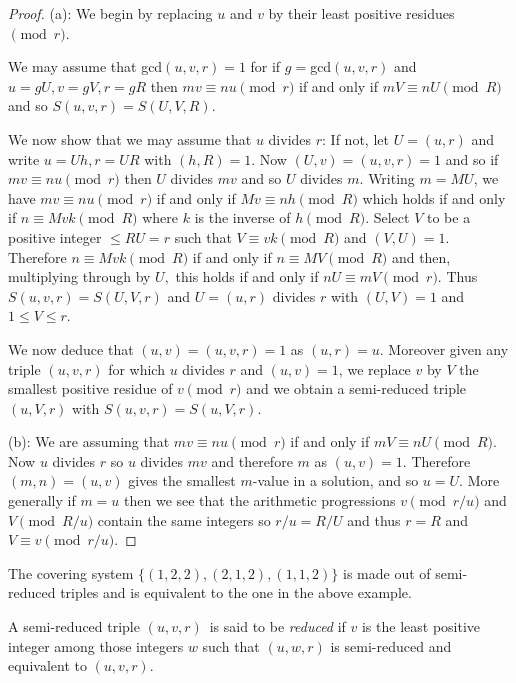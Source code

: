 \documentclass[12pt, a4paper,  reqno, english]{amsart}%
\numberwithin{equation}{section}
\theoremstyle{definition}
\renewcommand{\leq}{\leqslant}
\begin{document}
 \begin{proof}  (a):  We begin by replacing $u$ and $v$ by their least positive residues $\pmod r$.

 We may assume that gcd$(u,v,r)=1$ for if $g=$gcd$(u,v,r)$ and $u=gU, v=gV, r=gR$ then $mv\equiv nu \pmod r$ if and only if $mV\equiv nU \pmod R$ and so $S(u,v,r)=S(U,V,R)$.
 
 
 We now show that we may assume that $u$ divides $r$: If not, let
  $U=(u,r)$ and write $u=Uh, r=UR$ with $(h,R)=1$. Now $(U,v)=(u,v,r)=1$ and so if $mv\equiv nu \pmod r$ then $U$ divides $mv$ and so $U$ divides $m$. Writing $m=MU$, we have $mv\equiv nu \pmod r$ if and only if 
 $Mv\equiv n h \pmod { R}$  which holds  if and only if  $n \equiv M vk \pmod { R}$ where
$k$ is the inverse of $h \pmod R$. %
Select $V$ to be a positive integer $\leq   RU=r$ such that $V\equiv vk \pmod R$ and $(V,U)=1$. Therefore $n \equiv M vk \pmod { R}$ if and only if $n \equiv MV \pmod { R}$ and then, multiplying through by $U,$ this holds if and only if $nU \equiv m V \pmod r$.  Thus $S(u,v,r)=S(U,V,r)$ and  $ U=(u,r)$ divides $r$ with $(U,V)=1$ and  $1\leq V\leq r$.  

We now deduce that $(u,v)=(u,v,r)=1$ as $(u,r)=u$.  Moreover given any  triple $(u,v,r)$ for which $u$ divides $r$ and  $(u,v)=1$, we replace 
$v$ by $V$ the smallest positive residue of $v \pmod r$ and we obtain a semi-reduced triple $(u,V,r)$ with $S(u,v,r)=S(u,V,r)$.
\medskip

(b): We are assuming that $mv\equiv nu \pmod r$ if and only if $mV\equiv nU \pmod R$.
Now $u$ divides $r$ so $u$ divides $mv$ and therefore $m$ as $(u,v)=1$. Therefore $(m,n)=(u,v)$ gives the smallest $m$-value in a solution, and so $u=U$. More generally if $m=u$ then we see that the arithmetic progressions $v  \pmod {r/u}$ and $V \pmod {R/u}$
contain the same integers so $r/u=R/U$ and thus $r=R$ and $V\equiv v \pmod {r/u}$.
   \end{proof}

 The covering system $\{(1,2,2), (2,1,2), (1,1,2)\}$ is made out of semi-reduced triples and is equivalent to the one in the above example.
 
 A semi-reduced triple $(u,v,r)$ is said to be \emph{reduced} if $v$ is the least positive integer among those integers $w$ such that $(u,w,r)$ is semi-reduced and equivalent to $(u,v,r)$.
 
\end{document}
